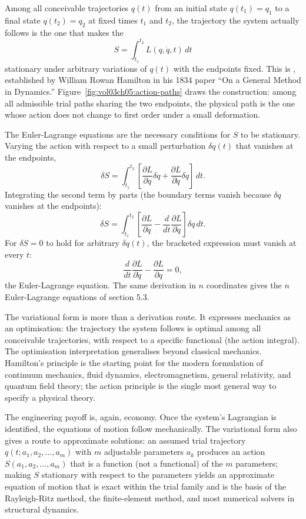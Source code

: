 Among all conceivable trajectories $q(t)$ from an initial state $q
(t_1) = q_1$ to a final state $q(t_2) = q_2$ at fixed times $t_1$
and $t_2$, the trajectory the system actually follows is the one
that makes the 
\[
S = \int_{t_1}^{t_2} L(q, \dot{q}, t) \,dt
\]
stationary under arbitrary variations of $q(t)$ with the endpoints
fixed. This is , established by William
Rowan Hamilton in his 1834 paper ``On a General Method in Dynamics.''
Figure~\ref{fig:vol03ch05:action-paths} draws the construction: among
all admissible trial paths sharing the two endpoints, the physical path
is the one whose action does not change to first order under a small
deformation.



The Euler-Lagrange equations are the necessary conditions for $S$ to
be stationary. Varying the action with respect to a small perturbation
$\delta q(t)$ that vanishes at the endpoints,
\[
\delta S = \int_{t_1}^{t_2} \left[\frac{\partial L}{\partial q}
\delta q + \frac{\partial L}{\partial \dot{q}} \delta \dot{q}\right]
\,dt.
\]
Integrating the second term by parts (the boundary terms vanish
because $\delta q$ vanishes at the endpoints):
\[
\delta S = \int_{t_1}^{t_2} \left[\frac{\partial L}{\partial q} -
\frac{d}{dt}\frac{\partial L}{\partial \dot{q}}\right] \delta q
\,dt.
\]
For $\delta S = 0$ to hold for arbitrary $\delta q(t)$, the bracketed
expression must vanish at every $t$:
\[
\frac{d}{dt}\frac{\partial L}{\partial \dot{q}} - \frac{\partial L}{
\partial q} = 0,
\]
the Euler-Lagrange equation. The same derivation in $n$ coordinates
gives the $n$ Euler-Lagrange equations of section 5.3.

The variational form is more than a derivation route. It expresses
mechanics as an optimisation: the trajectory the system follows is
optimal among all conceivable trajectories, with respect to a
specific functional (the action integral). The optimisation
interpretation generalises beyond classical mechanics. Hamilton's
principle is the starting point for the modern formulation of
continuum mechanics, fluid dynamics, electromagnetism, general
relativity, and quantum field theory; the action principle is the
single most general way to specify a physical theory.

The engineering payoff is, again, economy. Once the system's
Lagrangian is identified, the equations of motion follow mechanically.
The variational form also gives a route to approximate solutions: an
assumed trial trajectory $q(t; a_1, a_2, \ldots, a_m)$ with $m$
adjustable parameters $a_k$ produces an action $S(a_1, a_2, \ldots,
a_m)$ that is a function (not a functional) of the $m$ parameters;
making $S$ stationary with respect to the parameters yields an
approximate equation of motion that is exact within the trial family
and is the basis of the Rayleigh-Ritz method, the finite-element
method, and most numerical solvers in structural dynamics.

